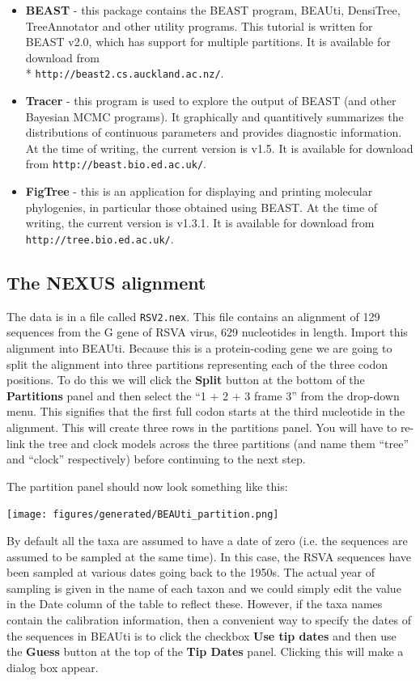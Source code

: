\documentclass[12pt]{article}
\newcommand{\BEASTVersion}{2.0}
\newcommand{\TracerVersion}{1.5}
\newcommand{\FigTreeVersion}{1.3.1}
\begin{document}
\begin{itemize}
\item {\bf BEAST} - this package contains the BEAST program, BEAUti, DensiTree, TreeAnnotator and other utility programs. This tutorial is written for BEAST v{\BEASTVersion}, which has support for multiple partitions. It is available for download from \\* \texttt{http://beast2.cs.auckland.ac.nz/}.
\item {\bf Tracer} - this program is used to explore the output of BEAST (and other Bayesian MCMC programs). It graphically and
quantitively summarizes the distributions of continuous parameters and provides diagnostic information. At the time of
writing, the current version is v{\TracerVersion}. It is available for download from \texttt{http://beast.bio.ed.ac.uk/}.
\item {\bf FigTree} - this is an application for displaying and printing molecular phylogenies, in particular those obtained using
BEAST. At the time of writing, the current version is v{\FigTreeVersion}. It is available for download from \texttt{http://tree.bio.ed.ac.uk/}.
\end{itemize}

\subsection*{The NEXUS alignment}
The data is in a file called \texttt{RSV2.nex}. This file contains an alignment of 129 sequences from the G gene of RSVA virus, 629 nucleotides in length. Import this alignment into BEAUti. Because this is a protein-coding gene we are going to split the alignment into three partitions representing each of the three codon positions. To do this we will click the {\bf Split} button at the bottom of the {\bf Partitions} panel and then select the ``1 + 2 + 3 frame 3'' from the drop-down menu. This signifies that the first full codon starts at the third nucleotide in the alignment. This will create three rows in the partitions panel. You will have to re-link the tree and clock models across the three partitions (and name them ``tree'' and ``clock'' respectively) before continuing to the next step.

The partition panel should now look something like this:

\begin{center}
\texttt{[image: figures/generated/BEAUti\_partition.png]}
\end{center}

By default all the taxa are assumed to have a date of zero (i.e. the sequences are assumed to be sampled at the same time).
In this case, the RSVA sequences have been sampled at various dates going back to the 1950s. The actual year of sampling
is given in the name of each taxon and we could simply edit the value in the Date column of the table to reflect these.
However, if the taxa names contain the calibration information, then a convenient way to specify the dates of the sequences
in BEAUti is to click the checkbox {\bf Use tip dates} and then use the {\bf Guess} button at the top of the {\bf Tip Dates} panel. Clicking this will make a dialog box appear.
\end{document}
